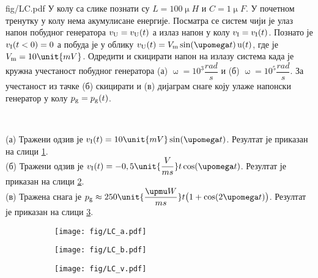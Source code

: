 \mnDifficult
\begin{slikaDesno}[0.833]{fig/LC.pdf}
\PID  У колу са слике познати су 
$L = 100\unit{\upmu H}$ и $C = 1\unit{\upmu F}$.
У почетном тренутку у колу нема 
акумулисане енергије. Посматра
се систем чији је улаз напон побудног генератора $v_{\rm U} = v_{\rm U}(t)$ а излаз напон у колу 
$v_{\rm I} = v_{\rm I}(t)$. 
Познато је $v_{\rm I}(t < 0) = 0$ а побуда
је у облику $v_{\rm U}(t) = V_{\rm m} 
\sin(\upomega t)\,{\rm u}(t)$, где је 
$V_{\rm m} = 10\unit{mV}$. Одредити 
и скицирати напон на 
излазу система када је кружна учестаност 
побудног генератора (а) $\upomega = 10^3 
\unit{\dfrac{rad}{s}}$ и (б) 
$\upomega = 10^5 
\unit{\dfrac{rad}{s}}$. За учестаност из 
тачке (б) скицирати и (в) дијаграм снаге 
коју улаже напонски генератор у колу
$p_{\rm g} =p_{\rm g}(t)$.
\end{slikaDesno}\\

\REZULTAT 

(а) Тражени одзив је $v_{\rm I}(t) = 10\unit{mV} \sin(\upomega t)$. 
Резултат је приказан на слици \ref{fig:\ID.a}.\\[2mm]

(б) Тражени одзив је $v_{\rm I}(t) = -0,5\unit{\dfrac{V}{ms}} t \cos(\upomega t)$.
Резултат је приказан на слици \ref{fig:\ID.b}.\\[2mm]

(в) Тражена снага је $p_{\rm g} \approx 250\unit{\dfrac{\upmu W}{ms}} t
\bigl(1 + \cos(2\upomega t) \bigr)$.
Резултат је приказан на слици \ref{fig:\ID.v}. \\

\noindent
\begin{figure}[ht!]
    \hspace*{0pt}%
    \begin{subfigure}[b]{0.32\textwidth}
        \texttt{[image: fig/LC\_a.pdf]}
        \caption{}
        \label{fig:\ID.a}
    \end{subfigure}
    \begin{subfigure}[b]{0.32\textwidth}
        \texttt{[image: fig/LC\_b.pdf]}
        \caption{}
        \label{fig:\ID.b}
    \end{subfigure}
    \begin{subfigure}[b]{0.32\textwidth}
        \texttt{[image: fig/LC\_v.pdf]}
        \caption{}
        \label{fig:\ID.v}
    \end{subfigure}
    \caption{}
    \label{fig:\ID.2}
\end{figure}



